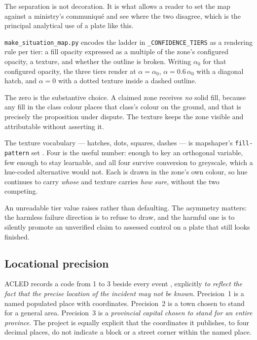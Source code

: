 \documentclass[11pt]{article}
\begin{document}
The separation is not decoration. It is what allows a reader to set the
map against a ministry's communiqué and see where the two disagree, which
is the principal analytical use of a plate like this.

\texttt{make\_situation\_map.py} encodes the ladder in
\texttt{\_CONFIDENCE\_TIERS} as a rendering rule per tier: a fill opacity
expressed as a multiple of the zone's configured opacity, a texture, and
whether the outline is broken. Writing $\alpha_0$ for that configured
opacity, the three tiers render at $\alpha = \alpha_0$, $\alpha =
0.6\,\alpha_0$ with a diagonal hatch, and $\alpha = 0$ with a dotted
texture inside a dashed outline.

The zero is the substantive choice. A claimed zone receives \emph{no}
solid fill, because any fill in the class colour places that class's
colour on the ground, and that is precisely the proposition under
dispute. The texture keeps the zone visible and attributable without
asserting it.

The texture vocabulary --- hatches, dots, squares, dashes --- is
mapshaper's \texttt{fill-pattern} set \cite{mapshaper}. Four is the
useful number: enough to key an orthogonal variable, few enough to stay
learnable, and all four survive conversion to greyscale, which a
hue-coded alternative would not. Each is drawn in the zone's own colour,
so hue continues to carry \emph{whose} and texture carries \emph{how
sure}, without the two competing.

An unreadable tier value raises rather than defaulting. The asymmetry
matters: the harmless failure direction is to refuse to draw, and the
harmful one is to silently promote an unverified claim to assessed
control on a plate that still looks finished.

\subsection{Locational precision}
\label{sec:locational-precision}

ACLED records a code from 1 to 3 beside every event
\cite{acled-codebook}, explicitly \emph{to reflect the fact that the
precise location of the incident may not be known}. Precision~1 is a
named populated place with coordinates. Precision~2 is a town chosen to
stand for a general area. Precision~3 is a \emph{provincial capital
chosen to stand for an entire province}. The project is equally explicit
that the coordinates it publishes, to four decimal places, do not
indicate a block or a street corner within the named place.
\end{document}
